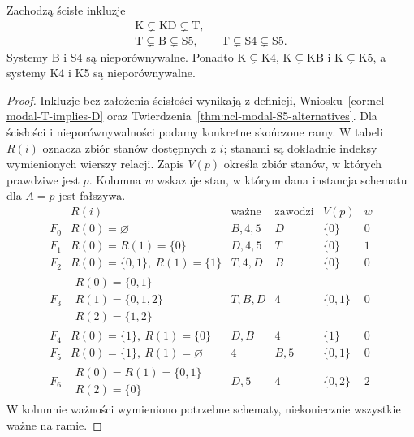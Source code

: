 \begin{twierdzenie}
\label{thm:ncl-modal-hierarchy}
Zachodzą ścisłe inkluzje
\[
\begin{gathered}
 \mathrm K\subsetneq\mathrm{KD}\subsetneq\mathrm T,\\
 \mathrm T\subsetneq\mathrm B\subsetneq\mathrm{S5},
 \qquad
 \mathrm T\subsetneq\mathrm{S4}\subsetneq\mathrm{S5}.
\end{gathered}
\]
Systemy B i S4 są nieporównywalne.
Ponadto $\mathrm K\subsetneq\mathrm{K4}$,
$\mathrm K\subsetneq\mathrm{KB}$ i
$\mathrm K\subsetneq\mathrm{K5}$,
a systemy K4 i K5 są nieporównywalne.
\end{twierdzenie}
\begin{proof}
Inkluzje bez założenia ścisłości wynikają z definicji,
Wniosku~\ref{cor:ncl-modal-T-implies-D}
oraz Twierdzenia~\ref{thm:ncl-modal-S5-alternatives}.
Dla ścisłości i nieporównywalności podamy
konkretne skończone ramy. W tabeli $R(i)$
oznacza zbiór stanów dostępnych z $i$;
stanami są dokładnie indeksy wymienionych wierszy
relacji. Zapis $V(p)$ określa zbiór stanów,
w których prawdziwe jest $p$. Kolumna $w$
wskazuje stan, w którym dana instancja
schematu dla $A=p$ jest fałszywa.
\[
\begin{array}{c|l|c|c|c|c}
 & R(i) & \text{ważne} & \text{zawodzi}
 &V(p)&w\\ \hline
 F_0&R(0)=\varnothing&B,4,5&D&\{0\}&0\\
 F_1&R(0)=R(1)=\{0\}&D,4,5&T&\{0\}&1\\
 F_2&R(0)=\{0,1\},\ R(1)=\{1\}&T,4,D&B&\{0\}&0\\
 F_3&
 \begin{array}{l}R(0)=\{0,1\}\\
 R(1)=\{0,1,2\}\\R(2)=\{1,2\}\end{array}
 &T,B,D&4&\{0,1\}&0\\
 F_4&R(0)=\{1\},\ R(1)=\{0\}&D,B&4&\{1\}&0\\
 F_5&R(0)=\{1\},\ R(1)=\varnothing&4&B,5&\{0,1\}&0\\
 F_6&
 \begin{array}{l}R(0)=R(1)=\{0,1\}\\R(2)=\{0\}\end{array}
 &D,5&4&\{0,2\}&2
\end{array}
\]
W kolumnie ważności wymieniono potrzebne
schematy, niekoniecznie wszystkie ważne na ramie.


\end{proof}
